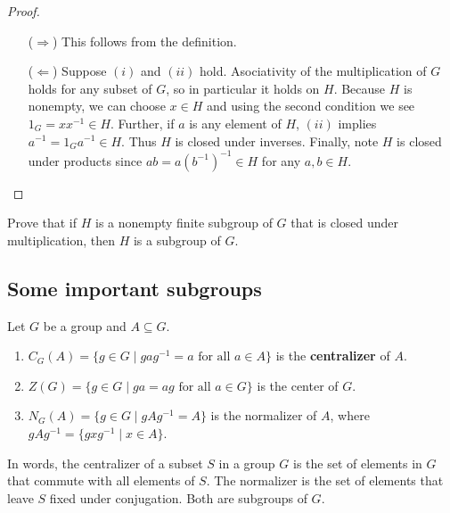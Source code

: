 \documentclass[11pt,a4paper]{article}
\begin{document}
\begin{proof}
\begin{enumerate}[label=(\roman*)]
    \item[(\(\Rightarrow\))] This follows from the definition.
    \item[(\(\Leftarrow\))] Suppose \((i)\) and \((ii)\) hold.
    Asociativity of the multiplication of \(G\) holds for any subset of \(G\), so in particular it holds on \(H\).
    Because \(H\) is nonempty, we can choose \(x\in H\) and using the second condition we see \(1_G = x x^{-1} \in H\).
    Further, if \(a\) is any element of \(H\),  \((ii)\) implies \(a^{-1} = 1_G a^{-1}\in H\).
    Thus \(H\) is closed under inverses.
    Finally, note \(H\) is closed under products since \(a b = a (b^{-1})^{-1}\in H\) for any \(a,b\in H\).

\end{enumerate}
\end{proof}

\begin{eje}
    Prove that if \(H\) is a nonempty finite subgroup of \(G\) that is closed under multiplication, then \(H\) is a subgroup of \(G\).
\end{eje}

\subsection{Some important subgroups}



\begin{defi}
    Let $G$ be a group and  $A \subseteq G$.
    \begin{enumerate}[label=(\roman*)]
        \item \(C_G(A) = \{g \in G \mid g a g^{-1} = a \text{ for all } a \in A\}\) is the \textbf{centralizer} of $A$.
        \item \(Z(G) = \{g \in G \mid g a = a g \text{ for all } a \in G\}\) is the center of $G$.
        \item \(N_G(A) = \{g \in G \mid g A g^{-1} = A\}
\) is the normalizer of $A$, where $g A g^{-1} = \{g x g^{-1} \mid x \in A\}$.
 
    \end{enumerate}
\end{defi}

In words, the {centralizer} of a subset \( S \) in a group \( G \) is the set of elements in \( G \) that commute with all elements of \( S \). The {normalizer} is the set of elements that leave \( S \) fixed under conjugation. Both are subgroups of \( G \).
\end{document}

